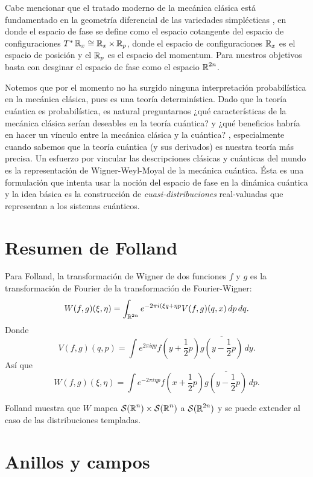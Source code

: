   Cabe mencionar que el tratado moderno de la mecánica
  clásica está fundamentado en la geometría diferencial de
  las variedades simplécticas
  \cite{mcinerneyFirstStepsDifferential2013}, en donde el
  espacio de fase se define como el espacio cotangente del
  espacio de configuraciones $T^{*} \operatorname{\mathbb{R}}_x \cong \operatorname{\mathbb{R}}_x \times
  \operatorname{\mathbb{R}}_p$, donde el espacio de configuraciones  $\operatorname{\mathbb{R}}_x$ es el
  espacio de posición y el $\operatorname{\mathbb{R}}_p$ es el espacio del
  momentum.  Para nuestros objetivos basta con desginar el
  espacio de fase como el espacio $\operatorname{\mathbb{R}}^{2n}$.

  Notemos que por el momento no ha surgido ninguna
  interpretación probabilística en la mecánica clásica, pues
  es una teoría determinística. Dado que la teoría cuántica
  es probabilística, es natural preguntarnos ¿qué
  características de la mecánica clásica serían deseables en
  la teoría cuántica? y ¿qué beneficios habría en hacer un
  vínculo entre la mecánica clásica y la cuántica?
  \cite{schroeckQuantumMechanicsPhase1996}, especialmente
  cuando sabemos que la teoría cuántica (y sus derivados) es
  nuestra teoría más precisa. Un esfuerzo por vincular las
  descripciones clásicas y cuánticas del mundo es la
  representación de Wigner-Weyl-Moyal de la mecánica
  cuántica.  Ésta es una formulación que intenta usar la
  noción del espacio de fase en la dinámica cuántica y la
  idea básica es la construcción de
  \textit{cuasi-distribuciones} real-valuadas que
  representan a los sistemas cuánticos.

  \section{Resumen de Folland}

  Para Folland, la transformación de Wigner de dos funciones
  $f$ y $g$ es la transformación de Fourier de la
  transformación de Fourier-Wigner:
  \[
    W(f,g)(\xi, \eta)
    = \int_{\operatorname{\mathbb{R}}^{2n}} e^{-2\pi i (\xi q + \eta p} V(f,g)(q,x)
    \, dp \, dq.
  \] 
  Donde
  \[
    V(f,g)(q,p)
    = \int e^{2\pi i q y} f(y + \frac{1}{2}p)\overline{g(y -
    \frac{1}{2}p)} \, dy.
  \] 
  Así que
  \[
    W(f,g)(\xi, \eta) = \int e^{-2\pi i \eta p }
    f(x+\frac{1}{2}p)\overline{g(y-\frac{1}{2}p)} \, dp.
  \] 

  Folland muestra que $W$ mapea $\operatorname{\mathcal S}(\operatorname{\mathbb{R}}^{n}) \times
  \operatorname{\mathcal S}(\operatorname{\mathbb{R}}^{n})$ a $\operatorname{\mathcal S}(\operatorname{\mathbb{R}}^{2n})$ y se puede extender al caso
  de las distribuciones templadas.

\section{Anillos y campos}

